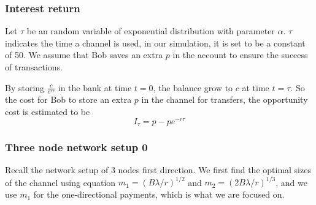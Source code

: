 \documentclass[twocolumn,10pt]{report}
\begin{document}
\subsubsection{Interest return}

Let $\tau$ be an random variable of exponential distribution with parameter $\alpha$. $\tau$ indicates the time a channel is used, in our simulation, it is set to be a constant of 50. We assume that Bob saves an extra $p$ in the account to ensure the success of transactions. 

By storing $\frac{c}{e^{r\tau}}$ in the bank at time $t=0$, the balance grow to $c$ at time $t=\tau$. So the cost for Bob to store an extra $p$ in the channel for transfers, the opportunity cost is estimated to be 
\begin{equation}
    I_\tau = p-pe^{-r\tau}
\end{equation}



\subsubsection{Three node network setup 0}

Recall the network setup of 3 nodes first direction. We first find the optimal sizes of the channel using equation $m_{1} = (B\lambda/r)^{1/2}$ and $m_{2}=(2B\lambda / r)^{1/3}$, and we use $m_{1}$ for the one-directional payments, which is what we are focused on.
\end{document}
